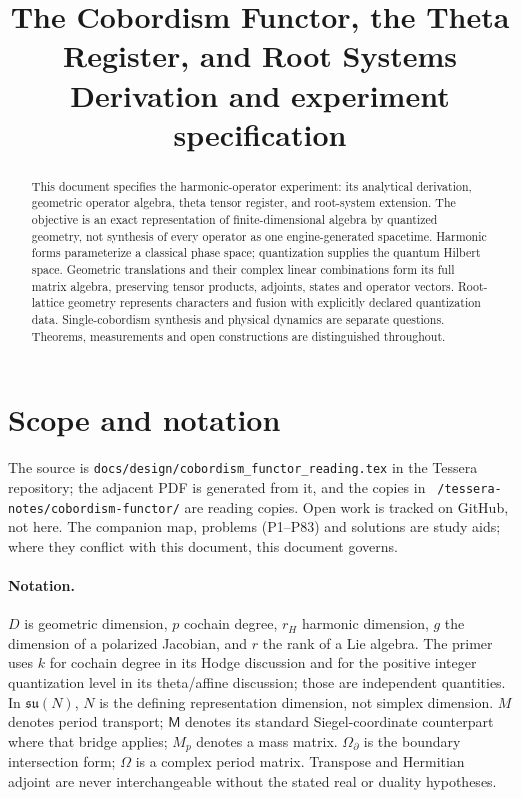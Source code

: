 \documentclass[11pt]{article}
\title{The Cobordism Functor, the Theta Register, and Root Systems\\[4pt]
\large Derivation and experiment specification}
\author{}
\date{}
\theoremstyle{definition}
\theoremstyle{remark}
\begin{document}
\maketitle

\begin{abstract}
This document specifies the harmonic-operator experiment: its analytical
derivation, geometric operator algebra, theta tensor register, and
root-system extension. The objective is an exact representation of
finite-dimensional algebra by quantized geometry, not synthesis of every
operator as one engine-generated spacetime. Harmonic forms parameterize a
classical phase space; quantization supplies the quantum Hilbert space.
Geometric translations and their complex linear combinations form its full
matrix algebra, preserving tensor products, adjoints, states and operator
vectors. Root-lattice geometry represents characters and fusion with
explicitly declared quantization data. Single-cobordism synthesis and
physical dynamics are separate questions. Theorems, measurements and open
constructions are distinguished throughout.
\end{abstract}

\begingroup\small
\section*{Scope and notation}
The source is \texttt{docs/design/cobordism\_functor\_reading.tex} in the
Tessera repository; the adjacent PDF is generated from it, and the copies
in \texttt{\string~/tessera-notes/cobordism-functor/} are reading copies.
Open work is tracked on GitHub, not here. The companion map, problems
(P1--P83) and solutions are study aids; where they conflict with this
document, this document governs.

\paragraph{Notation.}
$D$ is geometric dimension, $p$ cochain degree, $r_H$ harmonic dimension,
$g$ the dimension of a polarized Jacobian, and $r$ the rank of a Lie algebra.
The primer uses $k$ for cochain degree in its Hodge discussion and for
the positive integer quantization level in its theta/affine discussion;
those are independent quantities. In $\mathfrak{su}(N)$, $N$ is the defining
representation dimension, not simplex dimension. $M$ denotes period
transport; $\mathsf M$ denotes its standard Siegel-coordinate counterpart
where that bridge applies; $M_p$ denotes a mass matrix. $\Omega_\partial$
is the boundary intersection form; $\Omega$ is a complex period matrix.
Transpose and Hermitian adjoint are never interchangeable without the
stated real or duality hypotheses.
\endgroup
\clearpage
\tableofcontents
\clearpage
\end{document}
